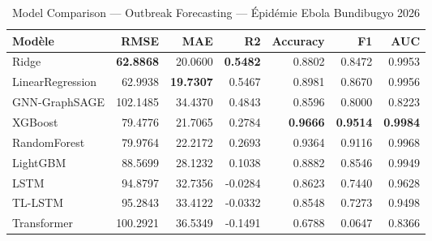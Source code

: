 \begin{table}[htbp]
\centering
\caption{Model Comparison — Outbreak Forecasting — Épidémie Ebola Bundibugyo 2026}
\label{tab:model_comparison}
\begin{tabular}{lrrrrrr}
\toprule
\textbf{Modèle} & \textbf{RMSE} & \textbf{MAE} & \textbf{R2} & \textbf{Accuracy} & \textbf{F1} & \textbf{AUC} \\
\midrule
Ridge & \textbf{62.8868} & 20.0600 & \textbf{0.5482} & 0.8802 & 0.8472 & 0.9953 \\
LinearRegression & 62.9938 & \textbf{19.7307} & 0.5467 & 0.8981 & 0.8670 & 0.9956 \\
GNN-GraphSAGE & 102.1485 & 34.4370 & 0.4843 & 0.8596 & 0.8000 & 0.8223 \\
XGBoost & 79.4776 & 21.7065 & 0.2784 & \textbf{0.9666} & \textbf{0.9514} & \textbf{0.9984} \\
RandomForest & 79.9764 & 22.2172 & 0.2693 & 0.9364 & 0.9116 & 0.9968 \\
LightGBM & 88.5699 & 28.1232 & 0.1038 & 0.8882 & 0.8546 & 0.9949 \\
LSTM & 94.8797 & 32.7356 & -0.0284 & 0.8623 & 0.7440 & 0.9628 \\
TL-LSTM & 95.2843 & 33.4122 & -0.0332 & 0.8548 & 0.7273 & 0.9498 \\
Transformer & 100.2921 & 36.5349 & -0.1491 & 0.6788 & 0.0647 & 0.8366 \\
\bottomrule
\end{tabular}
\end{table}